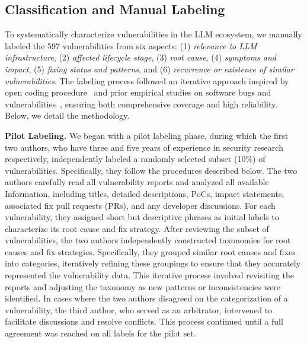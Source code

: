 \subsection{Classification and Manual Labeling}

To systematically characterize vulnerabilities in the LLM ecosystem, we manually labeled the 597 vulnerabilities from six aspects: (1) \textit{relevance to LLM infrastructure}, (2) \textit{affected lifecycle stage}, (3) \textit{root cause}, (4) \textit{symptoms and impact}, (5) \textit{fixing status and patterns}, and (6) \textit{recurrence or existence of similar vulnerabilities}. The labeling process followed an iterative approach inspired by open coding procedure~\cite{opencoding} and prior empirical studies on software bugs and vulnerabilities~\cite{shen2021compiler,chen2023dlframework,chen2021faults,quan2022jsdl,lai2024dlvul}, ensuring both comprehensive coverage and high reliability. Below, we detail the methodology.

\noindent \textbf{Pilot Labeling.} We began with a pilot labeling phase, during which the first two authors, who have three and five years of experience in security research respectively, independently labeled a randomly selected subset (10\%) of vulnerabilities. Specifically, they follow the procedures described below. The two authors carefully read all vulnerability reports and analyzed all available Information, including titles, detailed descriptions, PoCs, impact statements, associated fix pull requests (PRs), and any developer discussions. For each vulnerability, they assigned short but descriptive phrases as initial labels to characterize its root cause and fix strategy. After reviewing the subset of vulnerabilities, the two authors independently constructed taxonomies for root causes and fix strategies. Specifically, they grouped similar root causes and fixes into categories, iteratively refining these groupings to ensure that they accurately represented the vulnerability data. This iterative process involved revisiting the reports and adjusting the taxonomy as new patterns or inconsistencies were identified. In cases where the two authors disagreed on the categorization of a vulnerability, the third author, who served as an arbitrator, intervened to facilitate discussions and resolve conflicts. This process continued until a full agreement was reached on all labels for the pilot set. 

